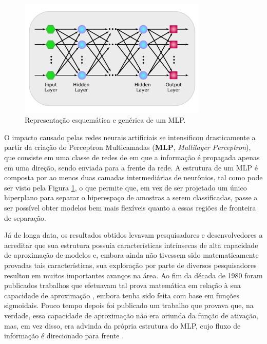 \begin{figure}[H]
    \centering
    \includegraphics[width=0.8\textwidth]{figs/ann_mlp.pdf}
    \caption{Representação esquemática e genérica de um MLP.}
    \label{fig:ann_mlp}
\end{figure}

O impacto causado pelas redes neurais artificiais se intensificou drasticamente a partir da criação do Perceptron Multicamadas (\textbf{MLP}, \textit{Multilayer Perceptron}), que consiste em uma classe de redes de em que a informação é propagada apenas em uma direção, sendo enviada para a frente da rede. A estrutura de um MLP é composta por ao menos duas camadas intermediárias de neurônios, tal como pode ser visto pela Figura \ref{fig:ann_mlp}, o que permite que, em vez de ser projetado um único hiperplano para separar o hiperespaço de amostras a serem classificadas, passe a ser possível obter modelos bem mais flexíveis quanto a essas regiões de fronteira de separação.


Já de longa data, os resultados obtidos levavam pesquisadores e desenvolvedores a acreditar que sua estrutura possuía características intrínsecas de alta capacidade de aproximação de modelos e, embora ainda não tivessem sido matematicamente provadas tais características, sua exploração por parte de diversos pesquisadores resultou em muitos importantes avanços na área. Ao fim da década de 1980 foram publicados trabalhos que efetuavam tal prova matemática em relação à sua capacidade de aproximação \citep{cybenko1989approximation, hornik1989multilayer}, embora tenha sido feita com base em funções sigmoidais. Pouco tempo depois foi publicado um trabalho que provava que, na verdade, essa capacidade de aproximação não era oriunda da função de ativação, mas, em vez disso, era advinda da própria estrutura do MLP, cujo fluxo de informação é direcionado para frente \citep{HORNIK1991251}.


